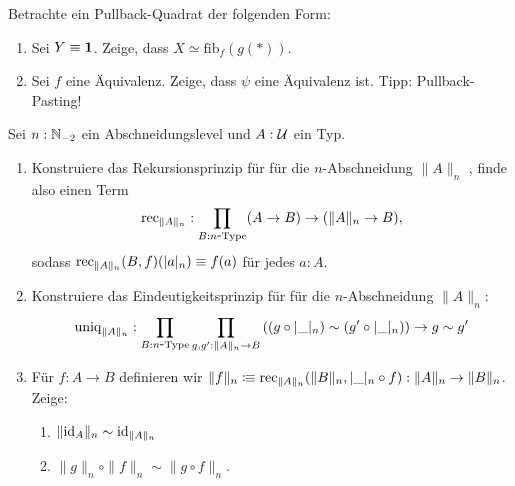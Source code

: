 \documentclass{uebung}
\begin{document}

\begin{exercise}
  Betrachte ein Pullback-Quadrat der folgenden Form:
  \begin{center}
  \end{center}
  \begin{enumerate}
    \item Sei $Y\equiv\mathbf{1}$.
      Zeige, dass $X\simeq\mathrm{fib}_f(g(\ast))$.
    \item Sei $f$ eine Äquivalenz.
      Zeige, dass $\psi$ eine Äquivalenz ist.
      {\tiny Tipp: Pullback-Pasting!}
  \end{enumerate}
\end{exercise}

\begin{exercise}
  Sei $n:\mathbb{N}_{-2}$ ein Abschneidungslevel und $A:\mathcal{U}$ ein Typ.
  \begin{enumerate}
    \item Konstruiere das Rekursionsprinzip für für die $n$-Abschneidung $\|A\|_n$ , finde also einen Term
      $$
      \mathrm{rec}_{\|A\|_n}:\prod_{B:n\mbox{-}\mathrm{Type}}(A \to B) \to (\|A\|_n \to B),
      $$
      sodass $\mathrm{rec}_{\|A\|_n}(B,f)(|a|_n) \equiv f(a)$ für jedes $a:A$.
    \item Konstruiere das Eindeutigkeitsprinzip für für die $n$-Abschneidung $\|A\|_n$:
      $$
      \mathrm{uniq}_{\|A\|_n}:\prod_{B:n\mbox{-}\mathrm{Type}}\prod_{g,g':\|A\|_n \to B} \left((g\circ |\_|_n) \sim (g'\circ |\_|_n)\right) \to g \sim g'
      $$
    \item
  Für $f:A\to B$ definieren wir $\|f\|_n\vcentcolon\mspace{-1.2mu}\equiv \mathrm{rec}_{\|A\|_n}(\|B\|_n,|\_|_n\circ f):\|A\|_n\to\|B\|_n$.
  Zeige:
  \begin{enumerate}
    \item $\|\mathrm{id}_A\|_n\sim \mathrm{id}_{\|A\|_n}$
    \item $\|g\|_n\circ\|f\|_n\sim\|g \circ f\|_n$.
  \end{enumerate}
  \end{enumerate}
\end{exercise}
\end{document}
